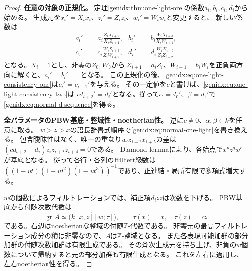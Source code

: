 \documentclass[11pt,a4paper]{ltjsarticle}
\theoremstyle{definition}
\newcommand{\gr}{\operatorname{gr}}
\begin{document}
\begin{proof}
\par\smallskip\noindent\textbf{任意の対象の正規化。}\quad
定理\ref{genidx:thm:one-light-ore}の係数$a_i,b_i,c_i,d_i$から始める。
生成元を$x_i'=X_i x_i$、$z_i'=Z_i z_i$、$w_i'=W_i w_i$と変更すると、
新しい係数は
\begin{align*}
a_i'&=a_i\frac{Z_iX_{i+2}}{X_iZ_{i+1}},&
b_i'&=b_i\frac{W_iX_{i+3}}{X_iW_{i+1}},\\
c_i'&=c_i\frac{W_iZ_{i+3}}{Z_iW_{i+2}},&
d_i'&=d_i\frac{W_iX_{i+3}}{Z_iZ_{i+2}}
\end{align*}
となる。$X_i=1$とし、非零の$Z_0,W_0$から
$Z_{i+1}=a_iZ_i$、$W_{i+1}=b_iW_i$を正負両方向に解くと、$a_i'=b_i'=1$となる。
この正規化の後、\eqref{genidx:eq:one-light-consistency-one}は$c_i'=c_{i+1}'$を与える。
その一定値を$c$と書けば、\eqref{genidx:eq:one-light-consistency-two}は
$cd_{i+2}'=d_i'$となる。従って$\alpha=d_0'$、$\beta=d_1'$で
\eqref{genidx:eq:normal-d-sequence}を得る。

\par\smallskip\noindent\textbf{全パラメータのPBW基底・整域性・noetherian性。}\quad
逆に$c\ne0$、$\alpha,\beta\in k$を任意に取る。
$w>z>x$の語長辞書式順序で\eqref{genidx:eq:normal-one-light}を書き換える。
包含曖昧性はなく、唯一の重なり$w_i z_{i+3}x_{i+5}$の差は
$(cd_{i+2}-d_i)z_i z_{i+2}z_{i+4}=0$である。
Diamond lemma\cite{Bergman}により、各始点で$x^p z^q w^r$が基底となる。
従って各行・各列のHilbert級数は
$((1-ut)(1-ut^2)(1-ut^3))^{-1}$であり、正連結・局所有限で多項式増大する。

$w$の個数によるフィルトレーションでは、補正項$d_i zz$は次数を下げる。
PBW基底から付随次数代数は
\[
\gr A\simeq\check{\bigl(k[x,z][w;\tau]\bigr)},\qquad
\tau(x)=x,\quad\tau(z)=cz
\]
である。右辺はnoetherianな整域の付随$\mathbb Z$-代数である。
非零元の最高フィルトレーション成分の積は非零なので、$A$は$\mathbb Z$-整域となる。
また各表現可能加群の部分加群の付随次数加群は有限生成である。
その斉次生成元を持ち上げ、非負の$w$個数について帰納すると元の部分加群も有限生成となる。
これを左右に適用し、左右noetherian性を得る。


\end{proof}
\end{document}

